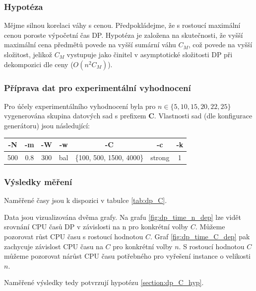 \documentclass[12pt]{article}
\begin{document}
\subsubsection*{Hypotéza} \label{section:dp_C_hyp}

Mějme silnou korelaci váhy s cenou. Předpokládejme, že s rostoucí maximální cenou poroste výpočetní čas DP. Hypotéza je založena na skutečnosti, že vyšší maximální cena předmětů povede na vyšší sumární váhu $C_M$, což povede na vyšší složitost, jelikož $C_M$ vystupuje jako činitel v asymptotické složitosti DP při dekompozici dle ceny ($O(n^2 C_M)$).

\subsubsection*{Příprava dat pro experimentální vyhodnocení}

Pro účely experimentálního vyhodnocení byla pro $n \in \{5, 10, 15, 20, 22, 25\}$ vygenerována skupina datových sad s prefixem \textbf{C}.
Vlastnosti sad (dle konfigurace generátoru) jsou následující:

\begin{center}
    \begin{tabular}{|c | c | c | c | c | c | c|}
        \hline
        -N & -m & -W & -w & -C & -c & -k \\ [0.1ex]
        \hline\hline
        500 & 0.8 & 300 & bal & \{100, 500, 1500, 4000\} & strong & 1\\
        \hline
    \end{tabular}
\end{center}

\subsubsection*{Výsledky měření}

Naměřené časy jsou k dispozici v tabulce \ref{tab:dp_C}.

Data jsou vizualizována dvěma grafy. Na grafu \ref{fig:dp_time_n_dep} lze vidět srovnání CPU časů DP v závislosti na n pro konkrétní volby $C$. Můžeme pozorovat růst CPU času s rostoucí hodnotou $C$. Graf \ref{fig:dp_time_C_dep} pak zachycuje závislost CPU času na $C$ pro konkrétní volby $n$. S rostoucí hodnotou $C$ můžeme pozorovat nárůst CPU času potřebného pro vyřešení instance o velikosti $n$.

Naměřené výsledky tedy potvrzují hypotézu \ref{section:dp_C_hyp}.
\end{document}
